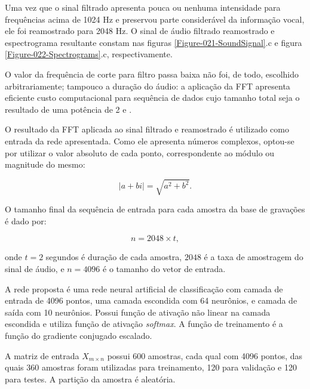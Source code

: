 Uma vez que o sinal filtrado apresenta pouca ou nenhuma intensidade para
frequências acima de 1024 Hz e preservou parte considerável da informação vocal,
ele foi reamostrado para 2048 Hz. O sinal de áudio filtrado reamostrado e
espectrograma resultante constam nas figuras \ref{Figure-021-SoundSignal}.c e
figura \ref{Figure-022-Spectrograms}.c, respectivamente.

O valor da frequência de corte para filtro passa baixa não foi, de todo,
escolhido arbitrariamente; tampouco a duração do áudio: a aplicação da FFT
apresenta eficiente custo computacional para sequência de dados cujo tamanho
total seja o resultado de uma potência de 2 \cite{Brigham:1988:FFT:131} e
\cite{Brigham:1988:FFT:148}.

O resultado da FFT aplicada ao sinal filtrado e reamostrado é utilizado como
entrada da rede apresentada. Como ele apresenta números complexos, optou-se por
utilizar o valor absoluto de cada ponto, correspondente ao módulo ou magnitude
do mesmo:

{
\setlength{\belowdisplayskip}{0pt} \setlength{\belowdisplayshortskip}{0pt}
\setlength{\abovedisplayskip}{0pt} \setlength{\abovedisplayshortskip}{0pt}

\begin{equation}
  |a + bi| = \sqrt{a^2 + b^2}.
  \label{Equation-021-ComplexModule}
\end{equation}
}

O tamanho final da sequência de entrada para cada amostra da base de gravações é
dado por:

{
\setlength{\belowdisplayskip}{0pt} \setlength{\belowdisplayshortskip}{0pt}
\setlength{\abovedisplayskip}{0pt} \setlength{\abovedisplayshortskip}{0pt}

\begin{equation}
  n = 2048 \times t,
  \label{Equation-022}
\end{equation}
}

onde $t = 2$ segundos é duração de cada amostra, $2048$ é a taxa de amostragem
do sinal de áudio, e $n = 4096$ é o tamanho do vetor de entrada.

A rede proposta é uma rede neural artificial de classificação com camada de
entrada de 4096 pontos, uma camada escondida com 64 neurônios, e camada de saída
com 10 neurônios. Possui função de ativação não linear na camada escondida e
utiliza função de ativação \textit{softmax}. A função de treinamento é a função
do gradiente conjugado escalado.

A matriz de entrada $X_{m\times n}$ possui 600 amostras, cada qual com 4096
pontos, das quais 360 amostras foram utilizadas para treinamento, 120 para
validação e 120 para testes. A partição da amostra é aleatória.

